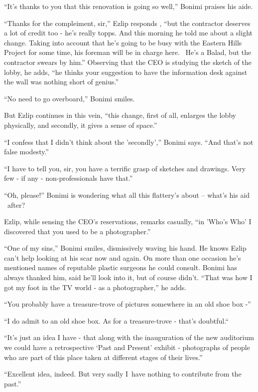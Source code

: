 \documentclass[twoside,11pt]{book}
\begin{document}
{}``It's thanks to you that this renovation is going so well,'' Bonimi{ }praises his aide.

``Thanks for the compleiment, sir,'' Ezlip responds , ``but the contractor
deserves a lot of credit too - he's really topps. And this morning he told me about a slight change. Taking into
account that he's going to be busy with the Eastern Hills Project for some time, his foreman will be in charge here.
~He's a Balad, but the contractor swears{ }by him.'' Observing that the CEO is studying the
sketch of the lobby, he adds, ``he thinks your suggestion to{ }have the information desk
against the wall was nothing short of genius.''

``No need to go overboard,'' Bonimi smiles.

But Ezlip continues in this vein, ``this change, first of all, enlarges the lobby physically, and secondly,
it gives a sense of space.''

``I confess that I didn't think about the 'secondly','' Bonimi says. ``And that's
not false modesty.''

``I have to tell you, sir, you have a terrific grasp of sketches and drawings. Very few - if any -
non-professionals have that.''

``Oh, please!'' Bonimi is wondering what all this flattery's about -- what's his aid \ after?

Ezlip, while sensing the CEO's reservations, remarks casually, ``in 'Who's Who' I discovered that you used
to be a photographer.''

``One of my sins,'' Bonimi smiles, dismissively waving his hand. He knows Ezlip can't help
looking at his scar now and again. On more than one occasion he's mentioned names of reputable{ }plastic
surgeons he could consult. Bonimi has always thanked him, said he'll look into it, but of course didn't.
``That was how I got my foot in the TV world - as a photographer,'' he adds.

``You probably have a treasure-trove of pictures somewhere in an old shoe box -''

``I do admit to an old shoe box. As for a treasure-trove - that's doubtful.``~

``It's just an idea I have - that along with the inauguration of the new auditorium we could have a
retrospective `Past and Present' exhibit - photographs of people who are part of this place taken at different stages
of their lives.''

``Excellent idea, indeed. But very sadly I~have nothing to contribute from the past.''
\end{document}
